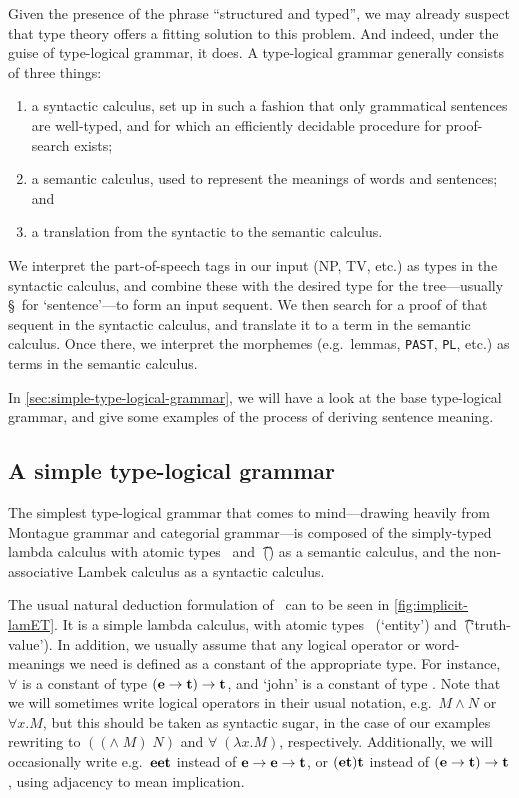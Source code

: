 Given the presence of the phrase ``structured and typed'', we may
already suspect that type theory offers a fitting solution to this
problem. And indeed, under the guise of type-logical grammar, it
does. A type-logical grammar generally consists of three things:
\begin{enumerate}[label=(\arabic*)]
\item a syntactic calculus, set up in such a fashion that only
  grammatical sentences are well-typed, and for which an efficiently
  decidable procedure for proof-search exists;
\item a semantic calculus, used to represent the meanings of words and
  sentences; and
\item a translation from the syntactic to the semantic calculus.
\end{enumerate}
We interpret the part-of-speech tags in our input (NP, TV, etc.) as
types in the syntactic calculus, and combine these with the desired
type for the tree---usually \S\ for `sentence'---to form an input
sequent.
We then search for a proof of that sequent in the syntactic calculus,
and translate it to a term in the semantic calculus.
Once there, we interpret the morphemes (e.g.\ lemmas, \texttt{PAST},
\texttt{PL}, etc.) as terms in the semantic calculus.

In \autoref{sec:simple-type-logical-grammar}, we will have a look at
the base type-logical grammar, and give some examples of the process
of deriving sentence meaning.



\subsection{A simple type-logical grammar}
\label{sec:simple-type-logical-grammar}

The simplest type-logical grammar that comes to mind---drawing
heavily from Montague grammar and categorial grammar---is composed of
the simply-typed lambda calculus with atomic types \e\ and \t\ (\lamET) as
a semantic calculus, and the non-associative Lambek calculus
\citep[NL;][]{lambek1961} as a syntactic calculus.

The usual natural deduction formulation of \lamET\ can to be seen in
\autoref{fig:implicit-lamET}. It is a simple lambda
calculus, with atomic types \e\ (`entity') and \t\ (`truth-value').
In addition, we usually assume that any logical operator or
word-meanings we need is defined as a constant of the appropriate
type. For instance, $\forall$ is a constant of type $(\mathbf{e}\rightarrow\mathbf{t})\rightarrow\mathbf{t}$,
and `john' is a constant of type \e. Note that we will sometimes write
logical operators in their usual notation, e.g.\ $M\wedge N$ or
$\forall x.M$, but this should be taken as syntactic sugar, in the
case of our examples rewriting to $(({\wedge}\;M)\;N)$ and
$\forall\;(\lambda{x}.M)$, respectively. Additionally, we will
occasionally write e.g.\ $\mathbf{e}\mathbf{e}\mathbf{t}$ instead of $\mathbf{e}\rightarrow\mathbf{e}\rightarrow\mathbf{t}$, or
$(\mathbf{e}\mathbf{t})\mathbf{t}$ instead of $(\mathbf{e}\rightarrow\mathbf{t})\rightarrow\mathbf{t}$, using adjacency to mean
implication.

